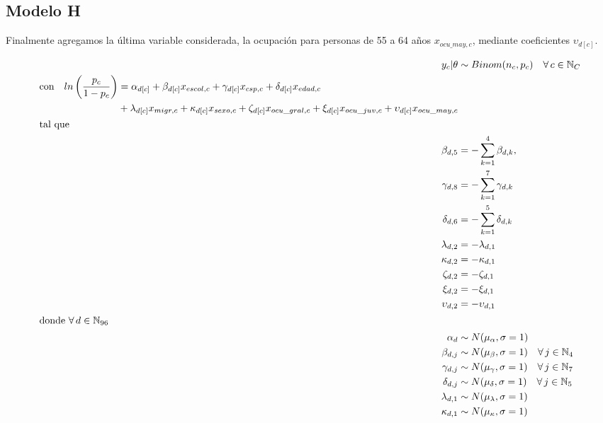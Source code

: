 \subsection*{Modelo H}

Finalmente agregamos la última variable considerada, la ocupación para personas de 55 a 64 años $x_{ocu\_may,c}$, mediante coeficientes $\upsilon_{d[c]}$. 

\begin{align}\label{eq:Modelo_Comp_G}
y_c|\theta & \sim Binom(n_c,p_c) \quad \forall \, c \in \mathbb{N}_C \nonumber \\
\begin{split}
\text{con} \quad ln\left(\dfrac{p_c}{1-p_c}\right) &= \alpha_{d[c]} + \beta_{d[c]} x_{escol,c} + \gamma_{d[c]} x_{csp,c} + \delta_{d[c]} x_{edad,c} \\
&+ \lambda_{d[c]} x_{migr,c} + \kappa_{d[c]} x_{sexo,c} + \zeta_{d[c]} x_{ocu\_gral,c} + \xi_{d[c]} x_{ocu\_juv,c} + \upsilon_{d[c]} x_{ocu\_may,c} 
\end{split}\\
\intertext{tal que} 
\beta_{d,5} &= -\sum\limits_{k = 1}^{4} \beta_{d,k}, \nonumber \\
\gamma_{d,8} &= -\sum\limits_{k = 1}^{7} \gamma_{d,k} \nonumber \\
\delta_{d,6} &= -\sum\limits_{k = 1}^{5} \delta_{d,k} \nonumber \\
\lambda_{d,2} &= -\lambda_{d,1} \nonumber \\
\kappa_{d,2} &= -\kappa_{d,1} \nonumber \\
\zeta_{d,2} &= -\zeta_{d,1} \nonumber \\
\xi_{d,2} &= -\xi_{d,1} \nonumber \\
\upsilon_{d,2} &= -\upsilon_{d,1} \nonumber \\
\intertext{donde $\forall \, d \in \mathbb{N}_{96}$}
\alpha_d &\sim N(\mu_{\alpha}, \sigma=1) \quad  \nonumber \\
\beta_{d,j} &\sim N(\mu_{\beta}, \sigma=1) \quad \forall \, j \in \mathbb{N}_{4} \nonumber \\
\gamma_{d,j} &\sim N(\mu_{\gamma}, \sigma=1) \quad \forall \, j \in \mathbb{N}_{7} \nonumber \\
\delta_{d,j} &\sim N(\mu_{\delta}, \sigma=1) \quad \forall \, j \in \mathbb{N}_{5}  \nonumber \\ 
\lambda_{d,1} &\sim N(\mu_{\lambda}, \sigma=1) \nonumber \\
\kappa_{d,1} &\sim N(\mu_{\kappa}, \sigma=1) \nonumber \\ 

\end{align}
